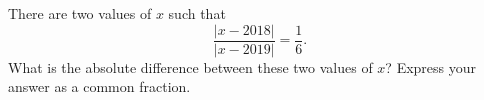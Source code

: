 There are two values of $x$ such that
\[
\dfrac{|x-2018|}{|x-2019|}=\dfrac{1}{6} .
\]
What is the absolute difference between these two values of $x$? Express your answer as a common fraction.
